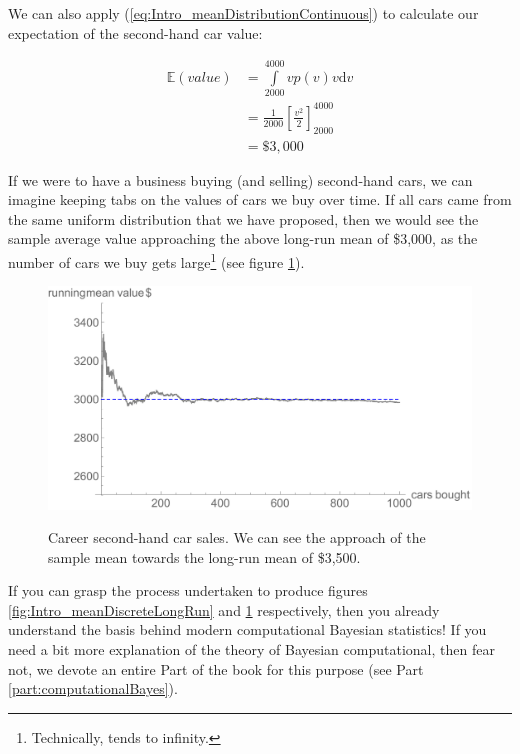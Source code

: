 \documentclass[11pt,fullpage]{book}
\begin{document}
We can also apply (\ref{eq:Intro_meanDistributionContinuous}) to calculate our expectation of the second-hand car value:

\begin{equation}\label{eq:Intro_meanCoinContinuous}
\begin{align}
\mathbb{E}(value) &= \int\limits_{2000}^{4000} v p(v)v\mathrm{d}v\\
&= \frac{1}{2000}\left[\frac{v^2}{2}\right]^{4000}_{2000}\\ 
&= \$3,000
\end{align}
\end{equation}

If we were to have a business buying (and selling) second-hand cars, we can imagine keeping tabs on the values of cars we buy over time. If all cars came from the same uniform distribution that we have proposed, then we would see the sample average value approaching the above long-run mean of \$3,000, as the number of cars we buy gets large\footnote{Technically, tends to infinity.} (see figure \ref{fig:Intro_meanContinuousLongRun}).

\begin{figure}
\centering
\scalebox{0.55} 
{\includegraphics{Intro_meanContinuousLongRun.pdf}}
\caption{Career second-hand car sales. We can see the approach of the sample mean towards the long-run mean of \$3,500.}\label{fig:Intro_meanContinuousLongRun}
\end{figure}

If you can grasp the process undertaken to produce figures \ref{fig:Intro_meanDiscreteLongRun} and \ref{fig:Intro_meanContinuousLongRun} respectively, then you already understand the basis behind modern computational Bayesian statistics! If you need a bit more explanation of the theory of Bayesian computational, then fear not, we devote an entire Part of the book for this purpose (see Part \ref{part:computationalBayes}).  
\end{document}
